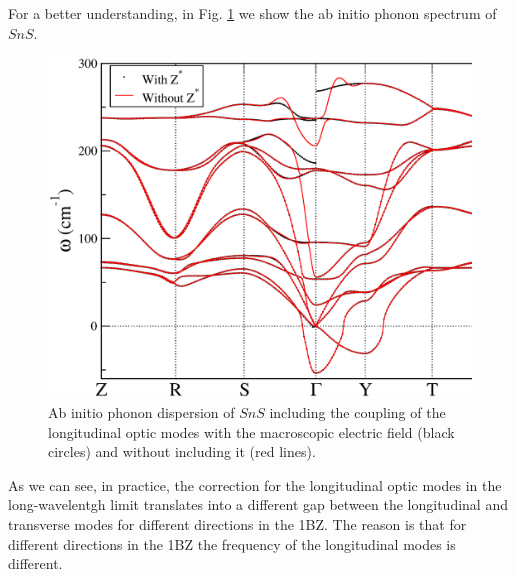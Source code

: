 For a better understanding, in Fig. \ref{LOTOsplitting} we show the ab initio phonon spectrum of $SnS$.
\begin{figure}[h]
\begin{center}
\includegraphics[width=0.8\linewidth]{Figures/charges.eps}
\caption[$SnS$ phonon spectrum with efective charges]{Ab initio phonon dispersion of $SnS$ including the coupling of the longitudinal optic modes with the macroscopic electric field (black circles) and without 
including it (red lines).}
\label{LOTOsplitting}
\end{center}
\end{figure}
As we can see, in practice, the correction for the longitudinal optic modes in the long-wavelentgh limit translates into a different gap between the longitudinal and transverse modes for different directions in the 1BZ. The reason 
is that for different directions in the 1BZ the frequency of the longitudinal modes is different.


